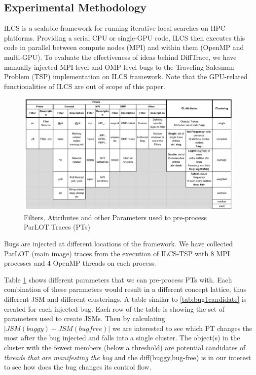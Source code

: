 

\subsection{Experimental Methodology}
ILCS is a scalable framework for running iterative local searches on HPC platforms.
%
Providing a serial CPU or single-GPU code, ILCS then executes this code in parallel between compute nodes (MPI) and within them (OpenMP and multi-GPU).
%
To evaluate the effectiveness of ideas behind DiffTrace, we have manually injected MPI-level and OMP-level bugs to the Traveling Salesman Problem (TSP) implementation on ILCS framework.
%
Note that the GPU-related functionalities of ILCS are out of scope of this paper.
%


\begin{figure}[t]
\centering
\includegraphics[width=6in]{figs/parametersTable.png}
\caption{Filters, Attributes and other Parameters used to pre-process ParLOT Traces (PTs)}
\label{tab:parameters}
\end{figure}



%
Bugs are injected at different locations of the framework.
%
We have collected ParLOT (main image) traces from the execution of ILCS-TSP with 8 MPI processes and 4 OpenMP threads on each process.



Table \ref{tab:parameters} shows different parameters that we can pre-process PTs with. Each combination of these parameters would result in a different concept lattice, thus different JSM and different clusterings. 
%
A table similar to \ref{tab:bug1candidate} is created for each injected bug.
%
Each row of the table is showing the set of parameters used to create JSMs.
%
Then by calculating $ |JSM(buggy) - JSM(bugfree)| $ we are interested to see which PT changes the most after the bug injected and falls into a single cluster.
%
The object(s) in the cluster with the fewest members (below a threshold) are potential candidates of \textit{threads that are manifesting the bug} and the diff(buggy,bug-free) is in our interest to see how does the bug changes its control flow.

